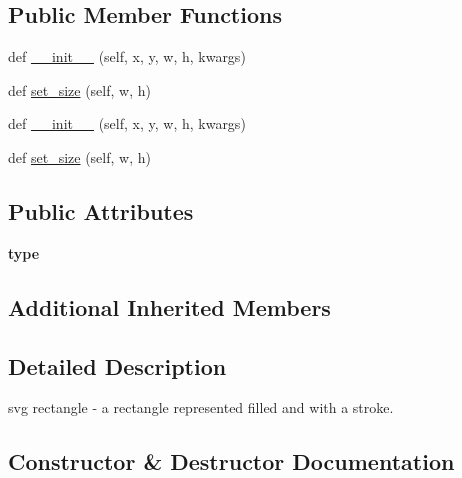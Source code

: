 \subsection*{Public Member Functions}
\begin{DoxyCompactItemize}
\item 
def \hyperlink{classremi_1_1gui_1_1SvgRectangle_a22e8e3ddb13cccc244142c1a9b3a2f59}{\+\_\+\+\_\+init\+\_\+\+\_\+} (self, x, y, w, h, kwargs)
\item 
def \hyperlink{classremi_1_1gui_1_1SvgRectangle_a29aa15daf103a941a68033a1883286ea}{set\+\_\+size} (self, w, h)
\item 
def \hyperlink{classremi_1_1gui_1_1SvgRectangle_a22e8e3ddb13cccc244142c1a9b3a2f59}{\+\_\+\+\_\+init\+\_\+\+\_\+} (self, x, y, w, h, kwargs)
\item 
def \hyperlink{classremi_1_1gui_1_1SvgRectangle_a29aa15daf103a941a68033a1883286ea}{set\+\_\+size} (self, w, h)
\end{DoxyCompactItemize}
\subsection*{Public Attributes}
\begin{DoxyCompactItemize}
\item 
{\bfseries type}\hypertarget{classremi_1_1gui_1_1SvgRectangle_ae1ce8455b51fded0fae674cb43b87215}{}\label{classremi_1_1gui_1_1SvgRectangle_ae1ce8455b51fded0fae674cb43b87215}

\end{DoxyCompactItemize}
\subsection*{Additional Inherited Members}


\subsection{Detailed Description}
\begin{DoxyVerb}svg rectangle - a rectangle represented filled and with a stroke.\end{DoxyVerb}
 

\subsection{Constructor \& Destructor Documentation}
